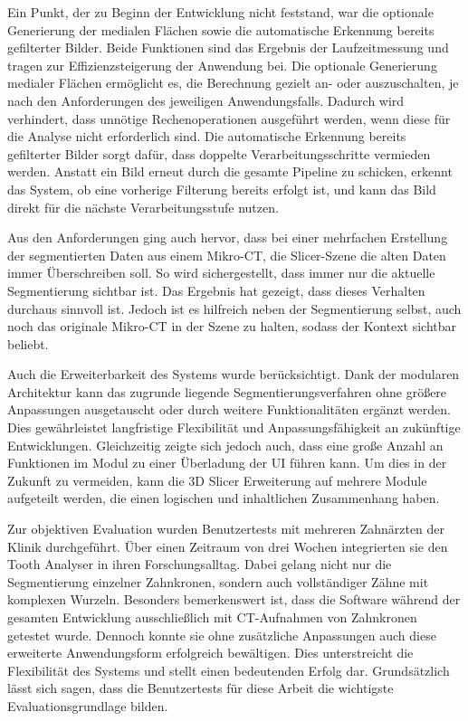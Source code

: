 Ein Punkt, der zu Beginn der Entwicklung nicht feststand, war die optionale Generierung
der medialen Flächen sowie die automatische Erkennung bereits gefilterter Bilder.
Beide Funktionen sind das Ergebnis der Laufzeitmessung und tragen zur
Effizienzsteigerung der Anwendung bei. Die optionale Generierung medialer Flächen
ermöglicht es, die Berechnung gezielt an- oder auszuschalten, je nach den
Anforderungen des jeweiligen Anwendungsfalls. Dadurch wird verhindert, dass
unnötige Rechenoperationen ausgeführt werden, wenn diese für die Analyse nicht erforderlich
sind. Die automatische Erkennung bereits gefilterter Bilder sorgt dafür, dass doppelte
Verarbeitungsschritte vermieden werden. Anstatt ein Bild erneut durch die
gesamte Pipeline zu schicken, erkennt das System, ob eine vorherige Filterung
bereits erfolgt ist, und kann das Bild direkt für die nächste Verarbeitungsstufe
nutzen.

Aus den Anforderungen ging auch hervor, dass bei einer mehrfachen Erstellung der
segmentierten Daten aus einem Mikro-\ac{CT}, die Slicer-Szene die alten Daten
immer Überschreiben soll. So wird sichergestellt, dass immer nur die aktuelle
Segmentierung sichtbar ist. Das Ergebnis hat gezeigt, dass dieses Verhalten
durchaus sinnvoll ist. Jedoch ist es hilfreich neben der Segmentierung selbst,
auch noch das originale Mikro-\ac{CT} in der Szene zu halten, sodass der Kontext
sichtbar beliebt.

Auch die Erweiterbarkeit des Systems wurde berücksichtigt. Dank der modularen Architektur
kann das zugrunde liegende Segmentierungsverfahren ohne größere Anpassungen ausgetauscht
oder durch weitere Funktionalitäten ergänzt werden. Dies gewährleistet
langfristige Flexibilität und Anpassungsfähigkeit an zukünftige Entwicklungen. Gleichzeitig
zeigte sich jedoch auch, dass eine große Anzahl an Funktionen im Modul zu einer
Überladung der \ac{UI} führen kann. Um dies in der Zukunft zu vermeiden, kann die
3D Slicer Erweiterung auf mehrere Module aufgeteilt werden, die einen logischen
und inhaltlichen Zusammenhang haben.

Zur objektiven Evaluation wurden Benutzertests mit mehreren Zahnärzten der
Klinik durchgeführt. Über einen Zeitraum von drei Wochen integrierten sie den Tooth
Analyser in ihren Forschungsalltag. Dabei gelang nicht nur die Segmentierung
einzelner Zahnkronen, sondern auch vollständiger Zähne mit komplexen Wurzeln.
Besonders bemerkenswert ist, dass die Software während der gesamten Entwicklung ausschließlich
mit \ac{CT}-Aufnahmen von Zahnkronen getestet wurde. Dennoch konnte sie ohne zusätzliche
Anpassungen auch diese erweiterte Anwendungsform erfolgreich bewältigen. Dies
unterstreicht die Flexibilität des Systems und stellt einen bedeutenden Erfolg
dar. Grundsätzlich lässt sich sagen, dass die Benutzertests für diese Arbeit die
wichtigste Evaluationsgrundlage bilden.


